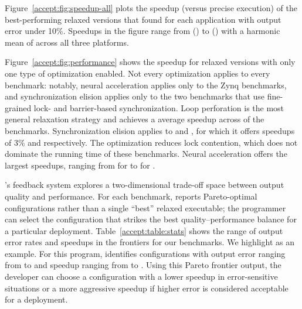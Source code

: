 Figure~\ref{accept:fig:speedup-all} plots the speedup (versus precise execution) of the
best-performing relaxed versions that \sysname found for each application with
output error under 10\%.
Speedups in the figure range from 
() to 
() with
a harmonic mean of  across all three platforms.

Figure~\ref{accept:fig:performance} shows the speedup for relaxed versions with only
one type of optimization enabled.
Not every optimization applies to every benchmark: notably, neural
acceleration applies only to the Zynq benchmarks, and synchronization elision
applies only to the two benchmarks that use fine-grained lock- and
barrier-based synchronization.
Loop perforation is the most general relaxation strategy and achieves a
 average speedup across
 of the benchmarks.
Synchronization elision applies to  and
, for which it offers speedups of
3\%  %
and  respectively.
The optimization reduces lock contention, which does not dominate the running
time of these benchmarks.
Neural acceleration offers the largest speedups, ranging from
 for 
to
 for .

\sysname's feedback system explores a two-dimensional trade-off space between
output quality and performance. For each benchmark, \sysname reports
Pareto-optimal configurations rather than a single ``best'' relaxed executable;
the
programmer can select the configuration that strikes the best
quality--performance balance for a particular deployment.
%
Table~\ref{accept:table:stats} shows the range of output error rates and speedups in
the frontiers for our benchmarks.
%
We highlight  as an example.
For this program, \sysname identifies 
configurations with output error ranging from  to
 and speedup ranging from
 to .
Using this Pareto frontier output, the developer can choose a
configuration with a lower speedup in error-sensitive situations or a
more aggressive  speedup if higher
error is considered acceptable for a
deployment.

